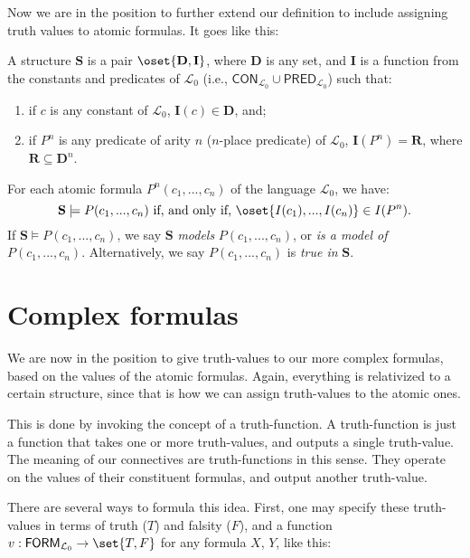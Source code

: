 Now we are in the position to further extend our definition to include assigning truth values to atomic formulas. It goes like this: 

\begin{defn} \label{atomicin}
A structure $\mathbf{S}$ is a pair $\oset{\mathbf{D}, \mathbf{I}}$, where $\mathbf{D}$ is any set, and $\mathbf{I}$ is a function from the constants and predicates of $\mathcal{L}_0$ (i.e., $\mathsf{CON}_{\mathcal{L}_0} \cup \mathsf{PRED}_{\mathcal{L}_0}$) such that:
\begin{enumerate}
	\item if $c$ is any constant of $\mathcal{L}_0$, $\mathbf{I}(c) \in \mathbf{D}$, and;
	\item if $P^n$ is any predicate  of arity $n$ ($n$-place predicate) of $\mathcal{L}_0$, $\mathbf{I}(P^n)=\mathbf{R}$, where $\mathbf{R} \subseteq \mathbf{D}^n$. 
\end{enumerate}
%
For each atomic formula $P^n(c_1, ..., c_n)$ of the language $\mathcal{L}_0$, we have:
\[
\mathbf{S} \models P(c_1, ..., c_n)\text{ if, and only if, }\oset{I(c_1), ..., I(c_n)} \in I(P^n).
\]
If $\mathbf{S} \models P(c_1, ..., c_n)$, we say $\mathbf{S}$ \textit{models} $P(c_1, ..., c_n)$, or \textit{is a model of} $P(c_1, ..., c_n)$. Alternatively, we say $P(c_1, ..., c_n)$ is \textit{true in} $\mathbf{S}$. 
\end{defn}

\section{Complex formulas}

We are now in the position to give truth-values to our more complex formulas, based on the values of the atomic formulas. Again, everything is relativized to a certain structure, since that is how we can assign truth-values to the atomic ones.

This is done by invoking the concept of a truth-function. A truth-function is just a function that takes one or more truth-values, and outputs a single truth-value. The meaning of our connectives are truth-functions in this sense. They operate on the values of their constituent formulas, and output another truth-value. 

There are several ways to formula this idea. First, one may specify these truth-values in terms of truth ($T$) and falsity ($F$), and a function $v: \mathsf{FORM}_{\mathcal{L}_0} \to \set{T, F}$ for any formula $X$, $Y$, like this:

